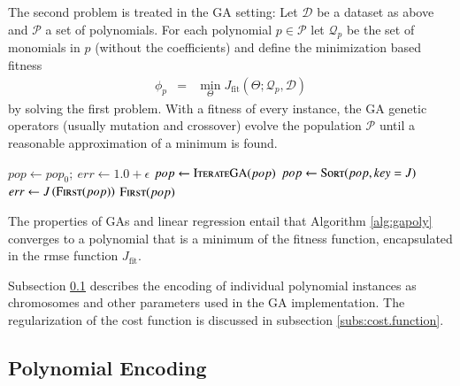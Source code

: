 \documentclass[review,preprint]{elsarticle}
\newcommand{\revised}[2]{}
\begin{document}
The second problem is treated in the \ac{GA} setting: Let $\mathcal{D}$ be a dataset as above and $\mathcal{P}$ a set of polynomials. For each polynomial $p\in \mathcal{P}$ let $\mathcal{Q}_p$ be the set of monomials in $p$ (without the coefficients) and define the minimization based fitness\revised{say what?  Do you mean something like a minimization based fitness??  Anti fitness seems odd.}{Adopted the reviewer suggestion.}
%
\begin{eqnarray}
\phi_p &=& \min_\Theta J_{\textrm{fit}}\left(\Theta;\mathcal{Q}_p,\mathcal{D}\right)
\end{eqnarray}
%
by solving the first problem. With a fitness of every instance, the \ac{GA} genetic operators (usually mutation and crossover) evolve the population $\mathcal{P}$ until a reasonable approximation of a minimum is found. 
%
\begin{algorithm}[t]
\begin{algorithmic}
	\State $pop \gets pop_0;\: err \gets 1.0+\epsilon$
		\State $pop \gets \Call{IterateGA}{pop}$
		\State $pop \gets \Call{Sort}{pop, key = J}$
		\State $err \gets J\left(\Call{First}{pop}\right)$
	\EndWhile
	\State\Return $\Call{First}{pop}$
\EndFunction
\end{algorithmic}
\caption{This \ac{EPR} algorithm uses linear regression for the calculation of the \ac{rmse} $J$ and the space of polynomials is searched in the \acp{GA} iteration step. At exit the \ac{rmse} of the fittest instance is bounded by $\epsilon$ or the maximum number of allowed iterations.}\label{alg:gapoly}
\end{algorithm} 
%
The properties of \acp{GA} and linear regression entail that Algorithm \ref{alg:gapoly} converges to a polynomial that is a minimum of the fitness function, encapsulated in the \ac{rmse} function $J_{\textrm{fit}}$.
%

%
Subsection \ref{subs:polynomial.encoding} describes the encoding of individual polynomial instances as chromosomes and other parameters used in the \ac{GA} implementation. The regularization of the cost function is discussed in subsection \ref{subs:cost.function}.

%
\subsection{Polynomial Encoding}\label{subs:polynomial.encoding}
\end{document}

